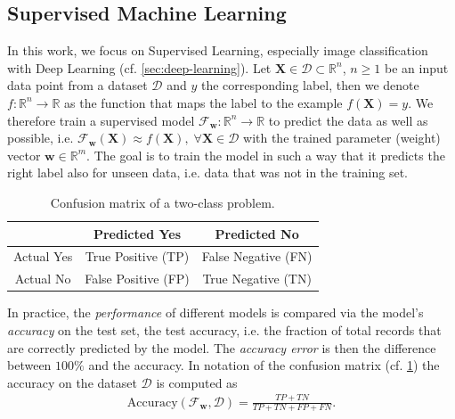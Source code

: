 \subsection{Supervised Machine Learning}

In this work, we focus on Supervised Learning, especially image classification with Deep Learning (cf. \cref{sec:deep-learning}).
Let $\mathbf{X} \in \mathcal{D} \subset \mathbb{R}^n$, $n \geq 1$ be an input data point from a dataset $\mathcal{D}$ and $y$ the corresponding label, then we denote $f: \mathbb{R}^n \to \mathbb{R}$ as the function that maps the label to the example $f(\mathbf{X})=y$. We therefore train a supervised model $\mathcal{F}_{\mathbf{w}} : \mathbb{R}^n  \to \mathbb{R}$ to predict the data as well as possible, i.e. $\mathcal{F}_{\mathbf{w}}(\mathbf{X}) \approx f(\mathbf{X}), \; \forall \mathbf{X} \in \mathcal{D}$ with the trained parameter (weight) vector $\mathbf{w} \in \mathbb{R}^m$. The goal is to train the model in such a way that it predicts the right label also for unseen data, i.e. data that was not in the training set. %

\begin{table} %
    \centering
    \begin{tabular}{|c|c|c|}
    \hline
         & Predicted Yes & Predicted No \\
         \hline
       Actual Yes  &  {\color[HTML]{036400} True Positive (TP)} & {\color[HTML]{CB0000} False Negative (FN)} \\
       \hline
       Actual No & {\color[HTML]{CB0000} False Positive (FP)} & {\color[HTML]{036400} True Negative (TN)} \\ \hline
    \end{tabular}
    \caption{Confusion matrix of a two-class problem.}
    \label{tab:confusion_matrix}
\end{table}

In practice, the \textit{performance} of different models is compared via the model's \textit{accuracy} on the test set, the test accuracy, i.e. the fraction of total records that are correctly predicted by the model. The \textit{accuracy error} is then the difference between $100\%$ and the accuracy. In notation of the confusion matrix (cf. \cref{tab:confusion_matrix}) the accuracy on the dataset $\mathcal{D}$ is computed as
\begin{align}
    \mathrm{Accuracy}(\mathcal{F}_{\mathbf{w}}, \mathcal{D}) = \frac{TP+TN}{TP+TN+FP+FN}.
\end{align}

